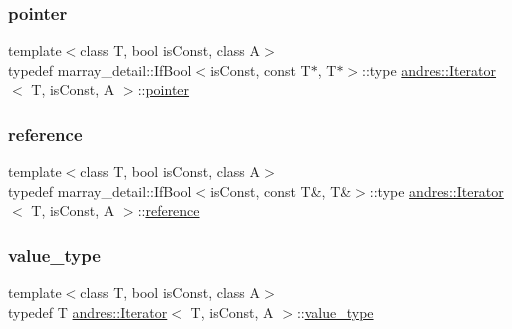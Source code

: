 \mbox{\label{classandres_1_1Iterator_adf2ba3f1a3cc9c98bff9c544afdb22f9}} 
\subsubsection{\texorpdfstring{pointer}{pointer}}
{\footnotesize\ttfamily template$<$class T, bool is\+Const, class A$>$ \\
typedef marray\+\_\+detail\+::\+If\+Bool$<$is\+Const, const T$\ast$, T$\ast$$>$\+::type \hyperlink{classandres_1_1Iterator}{andres\+::\+Iterator}$<$ T, is\+Const, A $>$\+::\hyperlink{classandres_1_1Iterator_adf2ba3f1a3cc9c98bff9c544afdb22f9}{pointer}}

\mbox{\label{classandres_1_1Iterator_a9805f26813688f04c33e798f7999e5f7}} 
\subsubsection{\texorpdfstring{reference}{reference}}
{\footnotesize\ttfamily template$<$class T, bool is\+Const, class A$>$ \\
typedef marray\+\_\+detail\+::\+If\+Bool$<$is\+Const, const T\&, T\&$>$\+::type \hyperlink{classandres_1_1Iterator}{andres\+::\+Iterator}$<$ T, is\+Const, A $>$\+::\hyperlink{classandres_1_1Iterator_a9805f26813688f04c33e798f7999e5f7}{reference}}

\mbox{\label{classandres_1_1Iterator_a3fd8a072268f4ad5c55963a6ea6d7a65}} 
\subsubsection{\texorpdfstring{value\+\_\+type}{value\_type}}
{\footnotesize\ttfamily template$<$class T, bool is\+Const, class A$>$ \\
typedef T \hyperlink{classandres_1_1Iterator}{andres\+::\+Iterator}$<$ T, is\+Const, A $>$\+::\hyperlink{classandres_1_1Iterator_a3fd8a072268f4ad5c55963a6ea6d7a65}{value\+\_\+type}}

